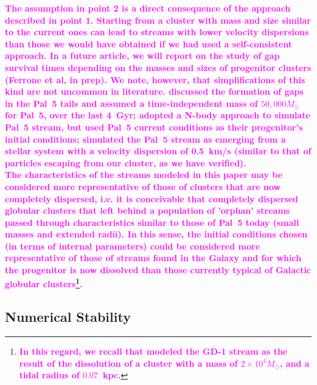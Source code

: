 \documentclass{aa}
\newcommand{\paola}[1]{\textcolor{magenta}{{#1}}}
\begin{document}
\textbf{\paola{The assumption in point 2 is a direct consequence of the approach described in point 1. Starting from a cluster with mass and size similar to the current ones can lead to streams with lower velocity dispersions than those we would have obtained if we had used a self-consistent approach. In a future article, we will report on the study of gap survival times depending on the masses and sizes of progenitor clusters (Ferrone et al, in prep). We note, however, that simplifications of this kind are not uncommon in literature. \citet{2017NatAs...1..633P} discussed the formation of gaps in the Pal~5 tails and assumed a time-independent mass of $50,000 M_\odot$ for Pal~5, over the last 4~Gyr; \citet{2017MNRAS.470...60E} adopted a N-body approach to simulate Pal~5 stream, but used Pal~5 current conditions as their progenitor's initial conditions; \citet{2019MNRAS.484.2009B} simulated the Pal~5 stream as emerging from a stellar system with a velocity dispersion of 0.5~km/s (similar to that of particles escaping from our cluster, as we have verified). \\The characteristics of the streams modeled in this paper may be considered more representative of those of clusters that are now completely dispersed, i.e. it is conceivable that completely dispersed globular clusters that left behind a population of 'orphan' streams passed through characteristics similar to those of Pal~5 today (small masses and extended radii). In this sense, the initial conditions chosen (in terms of internal parameters) could be considered more representative of those of streams found in the Galaxy and for which the progenitor is now dissolved \citep[see, for example, the population of streams without progenitors described by][]{2024ApJ...967...89I} than those currently typical of Galactic globular clusters\footnote{\textbf{\paola{In this regard, we recall that \citet{2014ApJ...795...95B} modeled the GD-1 stream as the result of the dissolution of a cluster with a mass of $2 \times 10^4 M_\odot$, and a tidal radius of $0.07$~kpc.}}}.  }}




  \subsection{Numerical Stability}\label{num_quality}
\end{document}
